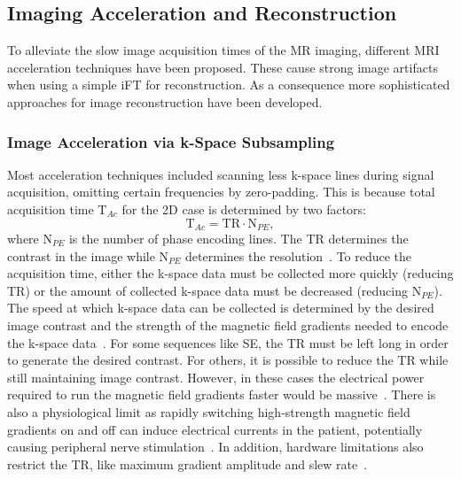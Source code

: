 \subsection{Imaging Acceleration and Reconstruction} \label{SubSec:ImagingAccelerationReconstruction}
To alleviate the slow image acquisition times of the MR imaging, different MRI acceleration techniques have been proposed. These cause strong image artifacts when using a simple iFT for reconstruction. As a consequence more sophisticated approaches for image reconstruction have been developed.

\subsubsection{Image Acceleration via k-Space Subsampling} \label{SubSubSec:AccelerationSubsampling}
Most acceleration techniques included scanning less k-space lines during signal acquisition, omitting certain frequencies by zero-padding. This is because total acquisition time $\text{T}_{Ac}$ for the 2D case is determined by two factors:
\begin{equation}
	\text{T}_{Ac} = \text{TR} \cdot \text{N}_{PE},
\end{equation}
where $\text{N}_{PE}$ is the number of phase encoding lines. The TR determines the contrast in the image while $\text{N}_{PE}$ determines the resolution~\cite{ParallelMRI}. To reduce the acquisition time, either the k-space data must be collected more quickly (reducing TR) or the amount of collected k-space data must be decreased (reducing $\text{N}_{PE}$). The speed at which k-space data can be collected is determined by the desired image contrast and the strength of the magnetic field gradients needed to encode the k-space data~\cite{ParallelMRI}. For some sequences like SE, the TR must be left long in order to generate the desired contrast. For others, it is possible to reduce the TR while still maintaining image contrast. However, in these cases the electrical power required to run the magnetic field gradients faster would be massive~\cite{ParallelMRI}. There is also a physiological limit as rapidly switching high-strength magnetic field gradients on and off can induce electrical currents in the patient, potentially causing peripheral nerve stimulation~\cite{Cohen1990,Ham1997}. In addition, hardware limitations also restrict the TR, like maximum gradient amplitude and slew rate~\cite{AdvancesPI}. \\
